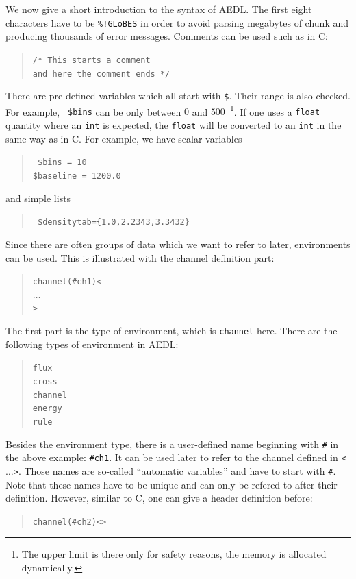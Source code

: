We now give a short introduction to the syntax of AEDL.
 The first eight characters have to be {\tt \%!GLoBES}
in order to avoid parsing megabytes of chunk
 and producing thousands of error messages. 
%
Comments can be used such as in C:
\begin{quote}
{\tt /* This starts a comment\\
 and here the comment ends */
}
\end{quote}
There are pre-defined variables which all start with {\tt \$}. Their range
is also checked. For example,  {\tt 
\$bins} can be only between $0$ and $500$~\footnote{The upper limit is 
there only for safety reasons, the memory is allocated dynamically.}. If one uses a {\tt float} quantity where  an {\tt int} is expected, the {\tt float} will be converted to an {\tt int} in the same way as in C.  For example, we have scalar variables
\begin{quote}
{\tt
\$bins = 10\\
\$baseline = 1200.0
}
\end{quote}
and simple lists
\begin{quote}
{\tt
\$densitytab=\{1.0,2.2343,3.3432\} 
}
\end{quote}
%
Since there are often groups of data which we want to refer to later,
environments can be used. This is illustrated 
with the channel definition part:
\begin{quote}
{\tt channel(\#ch1)<\\
\tb  $\ldots$\\
>
}
\end{quote}
The first part is the type of environment, which is {\tt channel} here. 
There are the following types of environment in AEDL:
\begin{quote}
{\tt flux\\
cross\\
channel\\
energy\\
rule
}
\end{quote}
Besides the environment type, there is a user-defined name 
beginning with {\tt \#}
in the above example: {\tt \#ch1}. It can be used later to refer to the 
channel defined in {\tt <$\ldots$>}. Those names are so-called 
``automatic variables'' and have to start with {\tt \#}. Note that these names have to be unique and can only be refered to after their definition.
However, similar to C, one can give a header definition before:
\begin{quote}
{\tt    channel(\#ch2)<>}
\end{quote}
